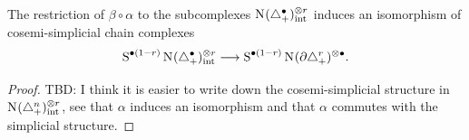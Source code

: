 \begin{proposition}\label{lemma:bartomilnor}
	The restriction of $\beta\circ \alpha$ to the subcomplexes  $\operatorname{N}_{}(\triangle_{+}^{\bullet})^{\otimes r}_{\mathrm{int}}$ induces an isomorphism of cosemi-simplicial chain complexes
	\[
	\operatorname{S}^{\bullet(1-r)}\operatorname{N}_{}(\triangle_{+}^{\bullet})^{\otimes r}_{\mathrm{int}}
	\longrightarrow 
	\operatorname{S}^{\bullet(1-r)}\operatorname{N}_{}(\partial\triangle_{+}^{r})^{\otimes \bullet}.
	\]
\end{proposition}
\begin{proof}
	TBD: I think it is easier to write down the cosemi-simplicial structure in $\operatorname{N}_{}(\triangle_{+}^{n})^{\otimes r}_{\mathrm{int}}$, see that $\alpha$ induces an isomorphism and that $\alpha$ commutes with the simplicial structure. 
\end{proof}
